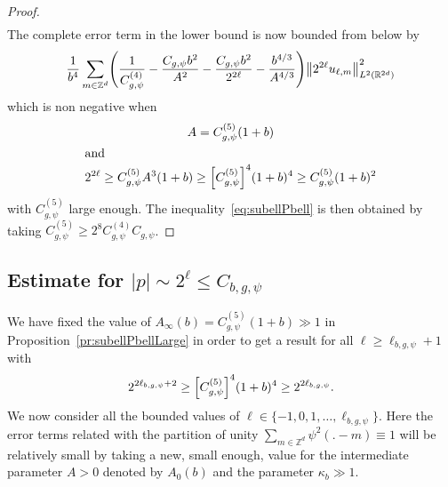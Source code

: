 \documentclass[10pt]{amsart}
\theoremstyle{definition}\newtheorem{defi}[theo]{Definition}\newtheorem{rema}[theo]{Remark}\newtheorem{exam}[theo]{Example}\newtheorem{exem}[theo]{Example}\newtheorem{nota}[theo]{Notation}
\newcommand{\Z}{\mathbb{Z}}
\newcommand{\R}{\mathbb{R}}
\let\originalleft\left
\let\originalright\right
\renewcommand{\left}{\mathopen{}\mathclose\bgroup\originalleft}
\renewcommand{\right}{\aftergroup\egroup\originalright}
\begin{document}
\begin{proof}
\begin{multline*}
\end{multline*}
The complete error term in the lower bound is now bounded from below by
\[
\frac{1}{b^{4}}\sum_{m\in\Z^{d}}\left(\frac{1}{C^{(4)}_{g,\psi}}-\frac{C_{g,\psi}b^{2}}{A^{2}}-\frac{C_{g,\psi}b^{2}}{2^{2\ell}}-\frac{b^{4/3}}{A^{4/3}}\right)
\left\|2^{2\ell}u_{\ell,m}\right\|_{L^{2}(\R^{2d})}^{2}
\]
which is non negative when
\begin{gather*}
A=C_{g,\psi}^{(5)}(1+b) \\
\intertext{and}
2^{2\ell}\geq C_{g,\psi}^{(5)} A^3(1+b) \geq\left[C_{g,\psi}^{(5)}\right]^{4}(1+b)^{4}\geq C_{g,\psi}^{(5)}(1+b)^2
\end{gather*}
with $C^{(5)}_{g,\psi}$ large enough. The inequality~\eqref{eq:subellPbell} is then obtained by taking $C_{g,\psi}^{(5)}\geq 2^{8}C_{g,\psi}^{(4)}C_{g,\psi}$.
\end{proof}

\subsection{Estimate for \texorpdfstring{$|p|\sim 2^{\ell}\leq C_{b,g,\psi}$}{|p| sim 2\^l=< C\_b,g, psi}}

We have fixed the value of $A_\infty(b)=C_{g,\psi}^{(5)}(1+b)\gg 1$ in Proposition~\ref{pr:subellPbellLarge} in order to get a result for all $\ell\geq \ell_{b,g,\psi}+1$ with
\begin{equation}\label{eq:defellb}
2^{2\ell_{b,g,\psi}+2}\geq \left[C_{g,\psi}^{(5)}\right]^{4}(1+b)^{4}\geq 2^{2\ell_{b,g,\psi}}.
\end{equation}
We now consider all the bounded values of $\ell\in \{-1,0,1,\dots,\ell_{b,g,\psi}\}$. Here the error terms related with the partition of unity $\sum_{m\in \Z^{d}}\psi^{2}(.-m)\equiv 1$ will be relatively small by taking a new, small enough, value for the intermediate parameter $A>0$ denoted by $A_0(b)$ and the parameter $\kappa_{b}\gg 1$.
\end{document}
